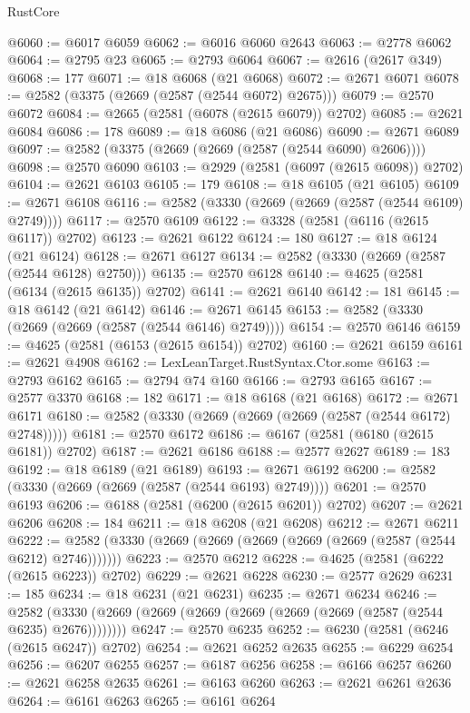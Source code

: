 \begin{lexlean}{RustCore}
\begin{coremodule}
@6060 := @6017 @6059
@6062 := @6016 @6060 @2643
@6063 := @2778 @6062
@6064 := @2795 @23
@6065 := @2793 @6064
@6067 := @2616 (@2617 @349)
@6068 := 177
@6071 := @18 @6068 (@21 @6068)
@6072 := @2671 @6071
@6078 := @2582 (@3375 (@2669 (@2587 (@2544 @6072) @2675)))
@6079 := @2570 @6072
@6084 := @2665 (@2581 (@6078 (@2615 @6079)) @2702)
@6085 := @2621 @6084
@6086 := 178
@6089 := @18 @6086 (@21 @6086)
@6090 := @2671 @6089
@6097 := @2582 (@3375 (@2669 (@2669 (@2587 (@2544 @6090) @2606))))
@6098 := @2570 @6090
@6103 := @2929 (@2581 (@6097 (@2615 @6098)) @2702)
@6104 := @2621 @6103
@6105 := 179
@6108 := @18 @6105 (@21 @6105)
@6109 := @2671 @6108
@6116 := @2582 (@3330 (@2669 (@2669 (@2587 (@2544 @6109) @2749))))
@6117 := @2570 @6109
@6122 := @3328 (@2581 (@6116 (@2615 @6117)) @2702)
@6123 := @2621 @6122
@6124 := 180
@6127 := @18 @6124 (@21 @6124)
@6128 := @2671 @6127
@6134 := @2582 (@3330 (@2669 (@2587 (@2544 @6128) @2750)))
@6135 := @2570 @6128
@6140 := @4625 (@2581 (@6134 (@2615 @6135)) @2702)
@6141 := @2621 @6140
@6142 := 181
@6145 := @18 @6142 (@21 @6142)
@6146 := @2671 @6145
@6153 := @2582 (@3330 (@2669 (@2669 (@2587 (@2544 @6146) @2749))))
@6154 := @2570 @6146
@6159 := @4625 (@2581 (@6153 (@2615 @6154)) @2702)
@6160 := @2621 @6159
@6161 := @2621 @4908
@6162 := LexLeanTarget.RustSyntax.Ctor.some
@6163 := @2793 @6162
@6165 := @2794 @74 @160
@6166 := @2793 @6165
@6167 := @2577 @3370
@6168 := 182
@6171 := @18 @6168 (@21 @6168)
@6172 := @2671 @6171
@6180 := @2582 (@3330 (@2669 (@2669 (@2669 (@2587 (@2544 @6172) @2748)))))
@6181 := @2570 @6172
@6186 := @6167 (@2581 (@6180 (@2615 @6181)) @2702)
@6187 := @2621 @6186
@6188 := @2577 @2627
@6189 := 183
@6192 := @18 @6189 (@21 @6189)
@6193 := @2671 @6192
@6200 := @2582 (@3330 (@2669 (@2669 (@2587 (@2544 @6193) @2749))))
@6201 := @2570 @6193
@6206 := @6188 (@2581 (@6200 (@2615 @6201)) @2702)
@6207 := @2621 @6206
@6208 := 184
@6211 := @18 @6208 (@21 @6208)
@6212 := @2671 @6211
@6222 := @2582 (@3330 (@2669 (@2669 (@2669 (@2669 (@2669 (@2587 (@2544 @6212) @2746)))))))
@6223 := @2570 @6212
@6228 := @4625 (@2581 (@6222 (@2615 @6223)) @2702)
@6229 := @2621 @6228
@6230 := @2577 @2629
@6231 := 185
@6234 := @18 @6231 (@21 @6231)
@6235 := @2671 @6234
@6246 := @2582 (@3330 (@2669 (@2669 (@2669 (@2669 (@2669 (@2669 (@2587 (@2544 @6235) @2676))))))))
@6247 := @2570 @6235
@6252 := @6230 (@2581 (@6246 (@2615 @6247)) @2702)
@6254 := @2621 @6252 @2635
@6255 := @6229 @6254
@6256 := @6207 @6255
@6257 := @6187 @6256
@6258 := @6166 @6257
@6260 := @2621 @6258 @2635
@6261 := @6163 @6260
@6263 := @2621 @6261 @2636
@6264 := @6161 @6263
@6265 := @6161 @6264

\end{coremodule}
\end{lexlean}
